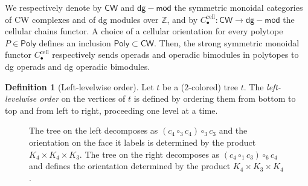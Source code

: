 \documentclass[JEP,XML,SOM,NoFloatCountersInSection,Unicode,published]{cedram}
\theoremstyle{definition}
\newtheorem{definition}{Definition}[section]
\theoremstyle{plain}
\begin{document}
We respectively denote by $\mathsf{CW}$ and $\mathsf{dg-mod}$ the symmetric monoidal categories of CW complexes and of dg modules over $\mathbb{Z}$, and by $C_\bullet^{\mathrm{cell}} : \mathsf{CW} \to \mathsf{dg-mod}$ the cellular chains functor.
A choice of a cellular orientation for every polytope $P \in \mathsf{Poly}$ defines an inclusion $\mathsf{Poly} \subset \mathsf{CW}$.
Then, the strong symmetric monoidal functor $C_\bullet^{\mathrm{cell}}$ respectively sends operads and operadic bimodules in polytopes to dg operads and dg operadic bimodules.

\begin{definition}[Left-levelwise order] \label{def:left-levelwise-tree}
Let $t$ be a ($2$-colored) tree $t$. The \emph{left-levelwise order} on the vertices of $t$ is defined by ordering them from bottom to top and from left to right, proceeding one level at a time.
\end{definition}

\begin{figure}[htb]

\centering

\begin{subfigure}{0.4\textwidth}
\centering
\exampleleftlevelwiseone
\end{subfigure}
\begin{subfigure}{0.4\textwidth}
\centering
\exampleleftlevelwisetwo
\end{subfigure}

\caption{The tree on the left decomposes as $(c_4\circ_3 c_4)\circ_3 c_3$ and the orientation on the face it labels is determined by the product $K_4 \times K_4 \times K_3$.
The tree on the right decomposes as $ (c_4\circ_1 c_3)\circ_6 c_4$ and defines the orientation determined by the product $K_4 \times K_3 \times K_4$.}
\label{fig:left-levelwise-order}
\end{figure}
\end{document}
